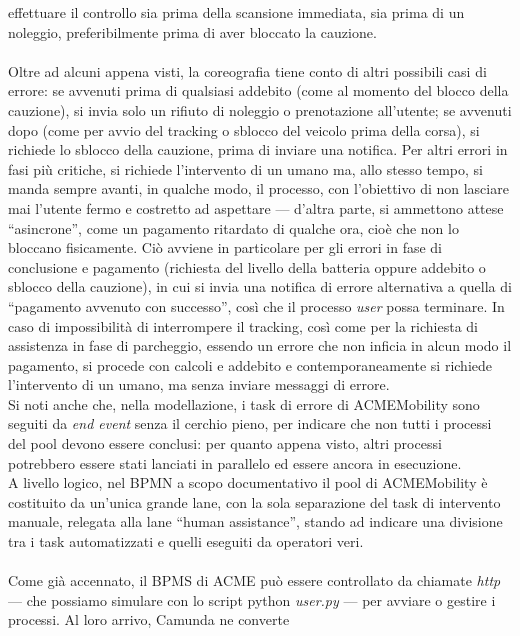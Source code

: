 effettuare il controllo sia prima della scansione immediata, sia prima di un
noleggio, preferibilmente prima di aver bloccato la cauzione.\\
\\
Oltre ad alcuni appena visti, la coreografia tiene conto di altri
possibili casi di errore: se avvenuti prima di qualsiasi addebito (come al
momento del blocco della cauzione), si invia solo un rifiuto di noleggio o
prenotazione all'utente; se avvenuti dopo (come per avvio del tracking o sblocco
del veicolo prima della corsa), si richiede lo sblocco della cauzione, prima di
inviare una notifica. Per altri errori in fasi più critiche, si richiede
l'intervento di un umano ma, allo stesso tempo, si manda sempre avanti, in
qualche modo, il processo, con l'obiettivo di non lasciare mai l'utente fermo e
costretto ad aspettare --- d'altra parte, si ammettono attese
``asincrone'', come un pagamento ritardato di qualche ora, cioè che non lo
bloccano fisicamente. Ciò avviene in particolare per gli errori in fase di
conclusione e pagamento (richiesta del livello della batteria oppure addebito o
sblocco della cauzione), in cui si invia una notifica di errore alternativa a
quella di ``pagamento avvenuto con successo'', così che il processo
\textit{user} possa terminare. In caso di impossibilità di interrompere il
tracking, così come per la richiesta di assistenza in fase di parcheggio,
essendo un errore che non inficia in alcun modo il pagamento, si procede con
calcoli e addebito e contemporaneamente si richiede l'intervento di un umano, ma
senza inviare messaggi di errore.\\
Si noti anche che, nella modellazione, i task di errore di ACMEMobility sono
seguiti da \textit{end event} senza il cerchio pieno, per indicare che non tutti
i processi del pool devono essere conclusi: per quanto appena visto, altri
processi potrebbero essere stati lanciati in parallelo ed essere ancora in
esecuzione.\\
A livello logico, nel BPMN a scopo documentativo il pool di ACMEMobility è
costituito da un'unica grande lane, con la sola separazione del task di
intervento manuale, relegata alla lane ``human assistance'', stando ad indicare
una divisione tra i task automatizzati e quelli eseguiti da operatori veri.\\
\\
Come già accennato, il BPMS di ACME può essere controllato da chiamate
\textit{http} --- che possiamo simulare con lo script python \textit{user.py}
--- per avviare o gestire i processi. Al loro arrivo, Camunda ne converte

